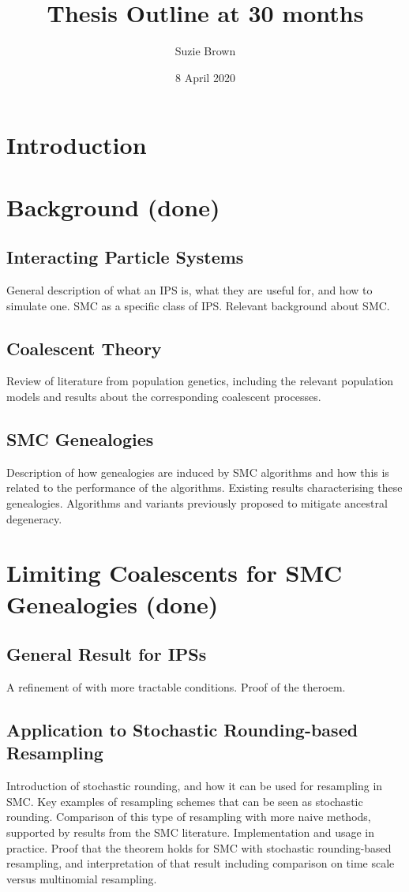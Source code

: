 \documentclass{article}
\title{Thesis Outline at 30 months}
\author{Suzie Brown}
\date{8 April 2020}
\begin{document}
\maketitle

\section{Introduction}

\section{Background (done)}
\subsection{Interacting Particle Systems}
General description of what an IPS is, what they are useful for, and how to simulate one. SMC as a specific class of IPS. Relevant background about SMC.
\subsection{Coalescent Theory}
Review of literature from population genetics, including the relevant population models and results about the corresponding coalescent processes.
\subsection{SMC Genealogies}
Description of how genealogies are induced by SMC algorithms and how this is related to the performance of the algorithms. Existing results characterising these genealogies. Algorithms and variants previously proposed to mitigate ancestral degeneracy.

\section{Limiting Coalescents for SMC Genealogies (done)}
\subsection{General Result for IPSs}
A refinement of \citet[Theorem 1]{koskela2018} with more tractable conditions. Proof of the theroem. 
\subsection{Application to Stochastic Rounding-based Resampling}
Introduction of stochastic rounding, and how it can be used for resampling in SMC. Key examples of resampling schemes that can be seen as stochastic rounding. Comparison of this type of resampling with more naive methods, supported by results from the SMC literature. Implementation and usage in practice. Proof that the theorem holds for SMC with stochastic rounding-based resampling, and interpretation of that result including comparison on time scale versus multinomial resampling.
\end{document}
